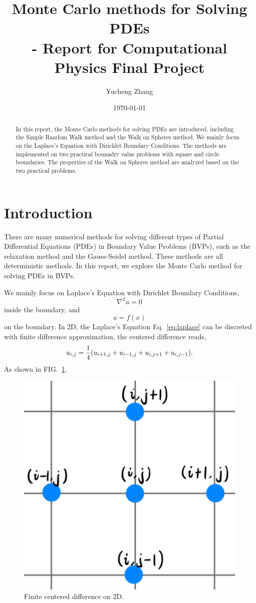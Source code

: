 \documentclass[aps, prl, reprint, groupedaddress]{revtex4-1}
\begin{document}
    
\title{Monte Carlo methods for Solving PDEs\\- Report for Computational Physics Final Project}
\author{Yucheng Zhang}
\date{\today}
    
\begin{abstract}
    In this report, the Monte Carlo methods for solving PDEs are introduced, including the Simple Random Walk method and the Walk on Spheres method. We mainly focus on the Laplace's Equation with Dirichlet Boundary Conditions. The methods are implemented on two practical bounadry value problems with square and circle boundaries. The properties of the Walk on Spheres method are analyzed based on the two practical problems.
\end{abstract}
    
\maketitle

\section{Introduction}

There are many numerical methods for solving different types of Partial Differential Equations (PDEs) in Boundary Value Problems (BVPs), such as the relaxation method and the Gauss-Seidel method. These methods are all deterministic methods. In this report, we explore the Monte Carlo method for solving PDEs in BVPs. 

We mainly focus on Laplace's Equation with Dirichlet Boundary Conditions,
\begin{equation}
    \nabla^2 u = 0
    \label{eq:laplace}
\end{equation} inside the boundary, and
\begin{equation}
    u = f(x)
\end{equation} on the boundary. In 2D, the Laplace's Equation Eq.~\ref{eq:laplace} can be discreted with finite difference approximation, the centered difference reads,
\begin{equation}
    u_{i,j} = \frac{1}{4} \qty(u_{i+1,j}+u_{i-1,j}+u_{i,j+1}+u_{i,j-1}).
\end{equation}
As shown in FIG.~\ref{fig:disc}.

\begin{figure}[htbp]
    \centering
    \includegraphics[width=.4\textwidth]{./figs/disc}
    \caption{\label{fig:disc} Finite centered difference on 2D.}
\end{figure}
\end{document}
